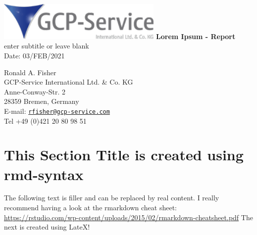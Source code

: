 \documentclass[oneside, 12pt, a4paper]{article}
\begin{document}
\begin{titlepage}
   \begin{center}
    \includegraphics[width=0.6\textwidth]{gpc-service-logo.png}
       \vspace*{1cm}
        \vfill
        \huge
        \textbf{Lorem Ipsum - Report} \\
        \large
        \vspace{0.5cm}
        enter subtitle or leave blank\\
        \vspace{0.5cm}
        Date: 03/FEB/2021\\
        \vspace{1.5cm}
        \vfill
        \vspace{0.8cm}

\begin{flushleft}
Ronald A. Fisher\\
GCP-Service International Ltd. \& Co. KG \\
Anne-Conway-Str. 2 \\
28359 Bremen, Germany \\
E-mail: \href{mailto:rfisher@gcp-service.com}{\nolinkurl{rfisher@gcp-service.com}}\\
Tel +49 (0)421 20 80 98 51
\end{flushleft}
\end{center}

\end{titlepage}

\tableofcontents
\newpage
\listoffigures
\newpage
\listoftables
\newpage

\hypertarget{this-section-title-is-created-using-rmd-syntax}{%
\section{This Section Title is created using
rmd-syntax}\label{this-section-title-is-created-using-rmd-syntax}}

The following text is filler and can be replaced by real content. I
really recommend having a look at the rmarkdown cheat sheet:
\url{https://rstudio.com/wp-content/uploads/2015/02/rmarkdown-cheatsheet.pdf}
The next is created using LateX!
\end{document}
